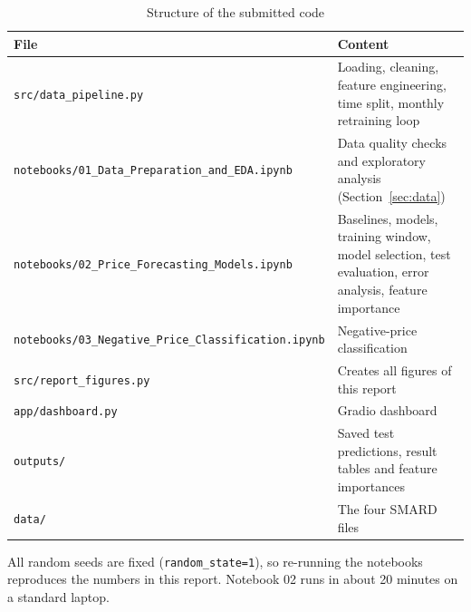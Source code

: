 \documentclass[12pt,oneside]{article}
\begin{document}
\begin{table}[!htbp]
    \centering
    \caption{Structure of the submitted code}
    \begin{tabularx}{\textwidth}{lX}
        \toprule
        File & Content \\
        \midrule
        \texttt{src/data\_pipeline.py} & Loading, cleaning, feature engineering, time split, monthly retraining loop \\
        \texttt{notebooks/01\_Data\_Preparation\_and\_EDA.ipynb} & Data quality checks and exploratory analysis (Section~\ref{sec:data}) \\
        \texttt{notebooks/02\_Price\_Forecasting\_Models.ipynb} & Baselines, models, training window, model selection, test evaluation, error analysis, feature importance \\
        \texttt{notebooks/03\_Negative\_Price\_Classification.ipynb} & Negative-price classification \\
        \texttt{src/report\_figures.py} & Creates all figures of this report \\
        \texttt{app/dashboard.py} & Gradio dashboard \\
        \texttt{outputs/} & Saved test predictions, result tables and feature importances \\
        \texttt{data/} & The four SMARD files \\
        \bottomrule
    \end{tabularx}
    \label{tab:code}
\end{table}

All random seeds are fixed (\texttt{random\_state=1}), so re-running the notebooks reproduces the numbers in this report. Notebook 02 runs in about 20 minutes on a standard laptop.


\end{document}
